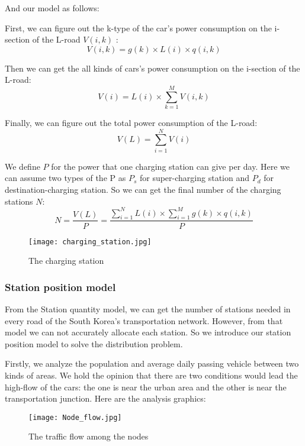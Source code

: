 \documentclass[12pt]{article}  %
\begin{document}
And our model as follows:

First, we can figure out the k-type of the car's power consumption on the i-section of the L-road $V(i,k)$ \cite{3}:
\begin{equation}
V(i,k) = g(k) \times L(i) \times q(i,k)
\end{equation}

Then we can get the all kinds of cars's power consumption on the i-section of the L-road:
\begin{equation}
V(i) = L(i) \times \sum\limits_{k = 1}^M {V(i,k)}
\end{equation}

Finally, we can figure out the total power consumption of the L-road:
\begin{equation}
V(L) = \sum\limits_{i = 1}^N {V(i)}
\end{equation}

We define $P$ for the power that one charging station can give per day. Here we can assume two types of the P as $P_s$ for super-charging station and $P_d$ for destination-charging station. So we can get the final number of the charging stations $N$:
\begin{equation}
N = \frac{{V(L)}}{P} = \frac{{\sum\limits_{i = 1}^N {L(i) \times \sum\limits_{i = 1}^M {g(k) \times q(i,k)} } }}{P}
\end{equation}

\begin{figure}[H]
	\centering
	\texttt{[image: charging\_station.jpg]}
	\caption{The charging station}\label{fig:5}
\end{figure}

\subsubsection{Station position model}
From the Station quantity model, we can get the number of stations needed in every road of the South Korea's transportation network. However, from that model we can not accurately allocate each station. So we introduce our station position model to solve the distribution problem. 

Firstly, we analyze the population and average daily passing vehicle between two kinds of areas. We hold the opinion that there are two conditions would lead the high-flow of the cars: the one is near the urban area and the other is near the transportation junction. Here are the analysis graphics:

\begin{figure}[H]
	\centering
	\texttt{[image: Node\_flow.jpg]}
	\caption{The traffic flow among the nodes}\label{fig:6}
\end{figure}
\end{document}

